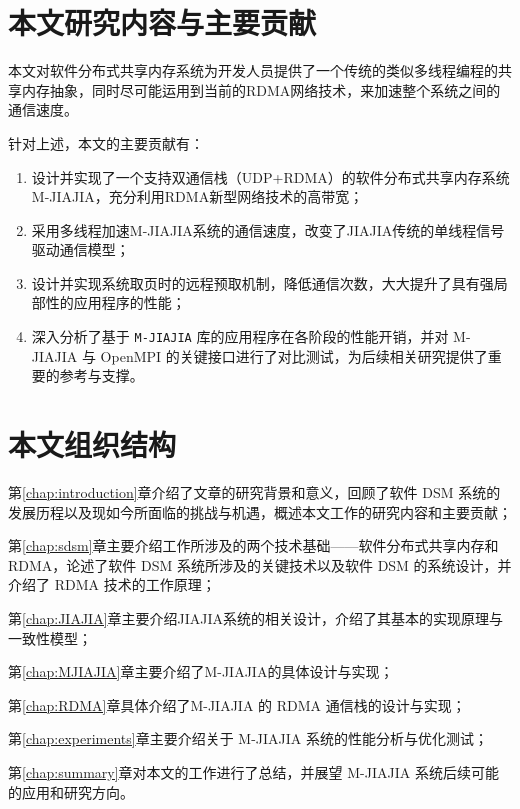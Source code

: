 {  \section{本文研究内容与主要贡献}
  本文对软件分布式共享内存系统为开发人员提供了一个传统的类似多线程编程的共享内存抽象，同时尽可能运用到当前的RDMA网络技术，来加速整个系统之间的通信速度。

  针对上述，本文的主要贡献有：
  \begin{enumerate}[leftmargin=1em, align=left]
    \item 设计并实现了一个支持双通信栈（UDP+RDMA）的软件分布式共享内存系统 M-JIAJIA，充分利用RDMA新型网络技术的高带宽；
    \item 采用多线程加速M-JIAJIA系统的通信速度，改变了JIAJIA传统的单线程信号驱动通信模型；
    \item 设计并实现系统取页时的远程预取机制，降低通信次数，大大提升了具有强局部性的应用程序的性能；
    \item 深入分析了基于 \texttt{M-JIAJIA} 库的应用程序在各阶段的性能开销，并对 M-JIAJIA 与 OpenMPI 的关键接口进行了对比测试，为后续相关研究提供了重要的参考与支撑。
  \end{enumerate}
  \section{本文组织结构}
  第\ref{chap:introduction}章介绍了文章的研究背景和意义，回顾了软件 DSM 系统的发展历程以及现如今所面临的挑战与机遇，概述本文工作的研究内容和主要贡献；

  第\ref{chap:sdsm}章主要介绍工作所涉及的两个技术基础——软件分布式共享内存和RDMA，论述了软件 DSM 系统所涉及的关键技术以及软件 DSM 的系统设计，并介绍了 RDMA 技术的工作原理；

  第\ref{chap:JIAJIA}章主要介绍JIAJIA系统的相关设计，介绍了其基本的实现原理与一致性模型；

  第\ref{chap:MJIAJIA}章主要介绍了M-JIAJIA的具体设计与实现；

  第\ref{chap:RDMA}章具体介绍了M-JIAJIA 的 RDMA 通信栈的设计与实现；

  第\ref{chap:experiments}章主要介绍关于 M-JIAJIA 系统的性能分析与优化测试；

  第\ref{chap:summary}章对本文的工作进行了总结，并展望 M-JIAJIA 系统后续可能的应用和研究方向。
}
